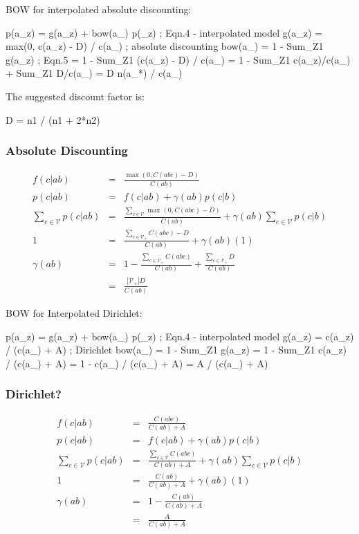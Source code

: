 \documentclass[ignorenonframetext]{beamer}
\newcommand{\vocab}{\mathcal{V}}
\begin{document}
BOW for interpolated absolute discounting:

   p(a_z)  = g(a_z) + bow(a_) p(_z)   ; Eqn.4 - interpolated model
   g(a_z)  = max(0, c(a_z) - D) / c(a_) ; absolute discounting
   bow(a_) = 1 - Sum_Z1 g(a_z)        ; Eqn.5
           = 1 - Sum_Z1 (c(a_z) - D) / c(a_)
           = 1 - Sum_Z1 c(a_z)/c(a_) + Sum_Z1 D/c(a_)
           = D n(a_*) / c(a_)

              The suggested discount factor is:

                   D = n1 / (n1 + 2*n2)

\begin{frame}\frametitle{Absolute Discounting}
\begin{eqnarray*}
f(c|ab) &=& \frac{\max(0, C(abc) - D)}{C(ab)} \\
p(c|ab) &=& f(c|ab) + \gamma(ab) p(c|b) \\
\sum_{c\in\vocab} p(c|ab) &=& \frac{\sum_{c\in\vocab} \max(0,
  C(abc)-D)}{C(ab)} + \gamma(ab) \sum_{c\in\vocab} p(c|b) \\
1 &=& \frac{\sum_{c\in\vocab_{+}} C(abc)-D}{C(ab)} + \gamma(ab)
(1) \\ 
\gamma(ab) &=& 1 - \frac{\sum_{c\in\vocab_{+}} C(abc)}{C(ab)} +
\frac{\sum_{c\in\vocab_{+}} D}{C(ab)} \\
&=& \frac{|\vocab_{+}| D}{C(ab)}
\end{eqnarray*}
\end{frame}

BOW for Interpolated Dirichlet:

   p(a_z)  = g(a_z) + bow(a_) p(_z)   ; Eqn.4 - interpolated model
   g(a_z)  = c(a_z) / (c(a_) + A)         ; Dirichlet
   bow(a_) = 1 - Sum_Z1 g(a_z)
           = 1 - Sum_Z1 c(a_z) / (c(a_) + A)
           = 1 - c(a_) / (c(a_) + A)
           = A / (c(a_) + A)


\begin{frame}\frametitle{Dirichlet?}
\begin{eqnarray*}
f(c|ab) &=& \frac{C(abc)}{C(ab) + A} \\
p(c|ab) &=& f(c|ab) + \gamma(ab) p(c|b) \\
\sum_{c\in\vocab} p(c|ab) &=& \frac{\sum_{c\in\vocab} C(abc)}{C(ab) + A} + \gamma(ab) \sum_{c\in\vocab} p(c|b) \\
1 &=& \frac{C(ab)}{C(ab) + A} + \gamma(ab) (1) \\ 
\gamma(ab) &=& 1 - \frac{C(ab)}{C(ab) + A} \\
&=& \frac{A}{C(ab) + A} \\
\end{eqnarray*}
\end{frame}
\end{document}
